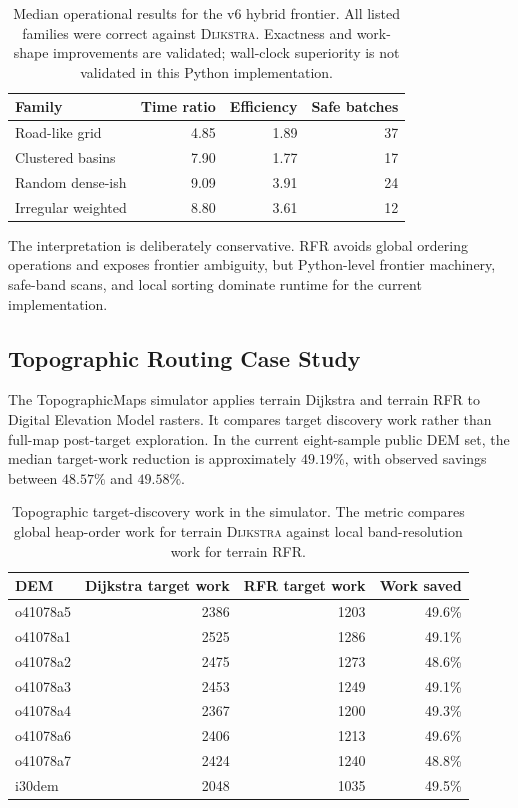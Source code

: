 \documentclass[11pt]{article}
\newcommand{\RFR}{\textsc{RFR}}
\newcommand{\Dijkstra}{\textsc{Dijkstra}}
\begin{document}
\begin{table}[h]
\centering
\begin{tabular}{lrrr}
\toprule
Family & Time ratio & Efficiency & Safe batches \\
\midrule
Road-like grid & 4.85 & 1.89 & 37 \\
Clustered basins & 7.90 & 1.77 & 17 \\
Random dense-ish & 9.09 & 3.91 & 24 \\
Irregular weighted & 8.80 & 3.61 & 12 \\
\bottomrule
\end{tabular}
\caption{Median operational results for the v6 hybrid frontier. All listed families were correct against \Dijkstra{}. Exactness and work-shape improvements are validated; wall-clock superiority is not validated in this Python implementation.}
\label{tab:operational}
\end{table}

The interpretation is deliberately conservative. \RFR{} avoids global ordering operations and exposes frontier ambiguity, but Python-level frontier machinery, safe-band scans, and local sorting dominate runtime for the current implementation.

\subsection{Topographic Routing Case Study}

The TopographicMaps simulator applies terrain Dijkstra and terrain \RFR{} to Digital Elevation Model rasters. It compares target discovery work rather than full-map post-target exploration. In the current eight-sample public DEM set, the median target-work reduction is approximately $49.19\%$, with observed savings between $48.57\%$ and $49.58\%$.

\begin{table}[h]
\centering
\begin{tabular}{lrrr}
\toprule
DEM & Dijkstra target work & RFR target work & Work saved \\
\midrule
o41078a5 & 2386 & 1203 & 49.6\% \\
o41078a1 & 2525 & 1286 & 49.1\% \\
o41078a2 & 2475 & 1273 & 48.6\% \\
o41078a3 & 2453 & 1249 & 49.1\% \\
o41078a4 & 2367 & 1200 & 49.3\% \\
o41078a6 & 2406 & 1213 & 49.6\% \\
o41078a7 & 2424 & 1240 & 48.8\% \\
i30dem & 2048 & 1035 & 49.5\% \\
\bottomrule
\end{tabular}
\caption{Topographic target-discovery work in the simulator. The metric compares global heap-order work for terrain \Dijkstra{} against local band-resolution work for terrain \RFR{}.}
\label{tab:topographic}
\end{table}
\end{document}
